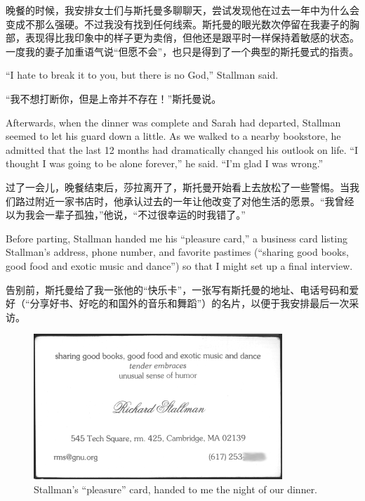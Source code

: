 \ifdefined\chs
晚餐的时候，我安排女士们与斯托曼多聊聊天，尝试发现他在过去一年中为什么会变成不那么强硬。不过我没有找到任何线索。斯托曼的眼光数次停留在我妻子的胸部，表现得比我印象中的样子更为卖俏，但他还是跟平时一样保持着敏感的状态。一度我的妻子加重语气说“但愿不会”，也只是得到了一个典型的斯托曼式的指责。
\fi

\ifdefined\eng
``I hate to break it to you, but there is no God,'' Stallman said. %
\fi

\ifdefined\chs
“我不想打断你，但是上帝并不存在！”斯托曼说。%
\fi

\ifdefined\eng
Afterwards, when the dinner was complete and Sarah had departed, Stallman seemed to let his guard down a little. As we walked to a nearby bookstore, he admitted that the last 12 months had dramatically changed his outlook on life. ``I thought I was going to be alone forever,'' he said. ``I'm glad I was wrong.''
\fi

\ifdefined\chs
过了一会儿，晚餐结束后，莎拉离开了，斯托曼开始看上去放松了一些警惕。当我们路过附近一家书店时，他承认过去的一年让他改变了对他生活的愿景。“我曾经以为我会一辈子孤独，”他说，“不过很幸运的时我错了。”
\fi

\ifdefined\eng
Before parting, Stallman handed me his ``pleasure card,'' a business card listing Stallman's address, phone number, and favorite pastimes (``sharing good books, good food and exotic music and dance'') so that I might set up a final interview.
\fi

\ifdefined\chs
告别前，斯托曼给了我一张他的“快乐卡”，一张写有斯托曼的地址、电话号码和爱好（“分享好书、好吃的和国外的音乐和舞蹈”）的名片，以便于我安排最后一次采访。
\fi

\ifdefined\eng
\begin{figure}[ht] \centering
  \includegraphics{pleasurecard}
  \caption{Stallman's ``pleasure'' card, handed to me the night of our dinner.}
\end{figure}
\fi

